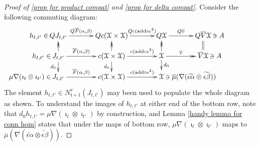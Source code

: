 \documentclass[11pt]{amsart} \renewcommand{\baselinestretch}{1.2}
\theoremstyle{plain}
\theoremstyle{definition}
\newcommand{\scrC}{\mathscr{C}}
\newcommand{\frakt}{\mathfrak{t}}
\newcommand{\calx}{\mathcal{X}}
\newcommand{\algs}{{\scrC\!\textit{om}}}
\newcommand{\uver}{^\mathrm{v}}
\begin{document}
\begin{Operations on the Bousfield-Kan spectral sequence}
\begin{proof}[Proof of \ref{prop for product compat} and \ref{prop for delta compat}]
Consider
the following commuting diagram:
\[\xymatrix@R=4mm@C=12mm{
\makebox[0cm][r]{$h_{t,t'}\in\,$}QJ_{t,t'}\ar[r]^-{Q\overline{F}(\alpha,\beta)}
&%
Qc(\calx \times\calx )\ar[r]^-{Qc(\textup{add}\circ\epsilon^2)}
&%
Q\calx \ar[r]^-{Q\overline{v}}
&%
Q\overline{V}\calx \makebox[0cm][l]{$\,\ni A$}\\%
\makebox[0cm][r]{$h_{t,t'}\in\,$}
J_{t,t'}\ar[r]^-{\overline{F}(\alpha,\beta)}
\ar@{->>}[u]
\ar[d]_-{d_0}
&%
c(\calx \times \calx )\ar[r]^-{c(\textup{add}\circ\epsilon^2)}
\ar@{->>}[u]
\ar[d]_-{d_0}
&%
\calx \ar@{->>}[r]^-{\overline{v}}
\ar@{->>}[u]
\ar[d]^-{d_0}
&%
\overline{V}\calx \makebox[0cm][l]{$\,\ni A$}\ar@{=}[u]
\\%
\makebox[0cm][r]{$\mu\nabla(\imath_t\otimes\imath_{t'})\in\,$}J_{t,t'}\ar[r]^-{\overline{F}(\alpha,\beta)}
&%
c(\calx \times \calx )\ar[r]^-{c(\textup{add}\circ\epsilon^2)}
&%
\calx \makebox[0cm][l]{$\,\ni\overline{\mu}(\nabla(\widetilde{\epsilon\alpha} \otimes\widetilde{\epsilon\beta}))$}
&%
}\]
The element $h_{t,t'}\in N\uver_{\frakt+1}(J_{t,t'})$ may been used to populate the whole diagram as shown. To understand the images of $h_{t,t'}$ at either end of the bottom row, note that $d_0h_{t,t'}=\mu\nabla(\imath_t\otimes \imath_{t'})$ by construction, and Lemma \ref{handy lemma for conn hom} states that under the maps of bottom row, $\mu\nabla(\imath_t\otimes \imath_{t'})$ maps to $\overline{\mu}(\nabla(\widetilde{\epsilon\alpha} \otimes\widetilde{\epsilon\beta}))$.


\end{proof}
\end{Operations on the Bousfield-Kan spectral sequence}
\end{document}
